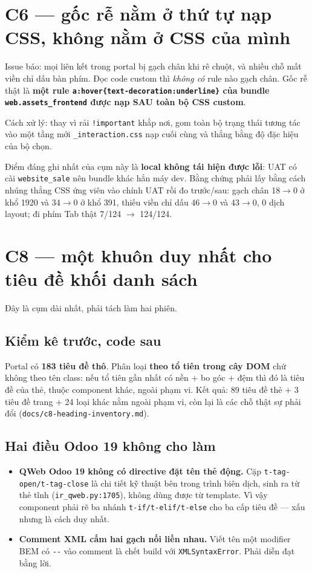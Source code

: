 \section{C6 --- gốc rễ nằm ở thứ tự nạp CSS, không nằm ở CSS của mình}

Issue báo: mọi liên kết trong portal bị gạch chân khi rê chuột, và nhiều chỗ mất viền chỉ dấu
bàn phím. Đọc code custom thì \emph{không có} rule nào gạch chân. Gốc rễ thật là \textbf{một
rule \texttt{a:hover\{text-decoration:underline\}} của bundle \texttt{web.assets\_frontend}
được nạp SAU toàn bộ CSS custom}.

Cách xử lý: thay vì rải \texttt{!important} khắp nơi, gom toàn bộ trạng thái tương tác vào một
tầng mới \texttt{\_interaction.css} nạp cuối cùng và thắng bằng độ đặc hiệu của bộ chọn.

Điểm đáng ghi nhất của cụm này là \textbf{local không tái hiện được lỗi}: UAT có cài
\texttt{website\_sale} nên bundle khác hẳn máy dev. Bằng chứng phải lấy bằng cách nhúng thẳng
CSS ứng viên vào chính UAT rồi đo trước/sau: gạch chân 18$\rightarrow$0 ở khổ 1920 và
34$\rightarrow$0 ở khổ 391, thiếu viền chỉ dấu 46$\rightarrow$0 và 43$\rightarrow$0, 0 dịch
layout; đi phím Tab thật 7/124 $\rightarrow$ 124/124.

\section{C8 --- một khuôn duy nhất cho tiêu đề khối danh sách}

Đây là cụm dài nhất, phải tách làm hai phiên.

\subsection{Kiểm kê trước, code sau}

Portal có \textbf{183 tiêu đề thô}. Phân loại \textbf{theo tổ tiên trong cây DOM} chứ không
theo tên class: nếu tổ tiên gần nhất có nền $+$ bo góc $+$ đệm thì đó là tiêu đề của thẻ, thuộc
component khác, ngoài phạm vi. Kết quả: 89 tiêu đề thẻ $+$ 3 tiêu đề trang $+$ 24 loại khác
nằm ngoài phạm vi, còn lại là các chỗ thật sự phải đổi
(\texttt{docs/c8-heading-inventory.md}).

\subsection{Hai điều Odoo 19 không cho làm}

\begin{itemize}
\item \textbf{QWeb Odoo 19 không có directive đặt tên thẻ động.} Cặp
  \texttt{t-tag-open/t-tag-close} là chi tiết kỹ thuật bên trong trình biên dịch, sinh ra từ
  thẻ tĩnh (\texttt{ir\_qweb.py:1705}), không dùng được từ template. Vì vậy component phải rẽ
  ba nhánh \texttt{t-if/t-elif/t-else} cho ba cấp tiêu đề --- xấu nhưng là cách duy nhất.
\item \textbf{Comment XML cấm hai gạch nối liền nhau.} Viết tên một modifier BEM có
  \texttt{-{}-} vào comment là chết build với \texttt{XMLSyntaxError}. Phải diễn đạt bằng lời.
\end{itemize}


